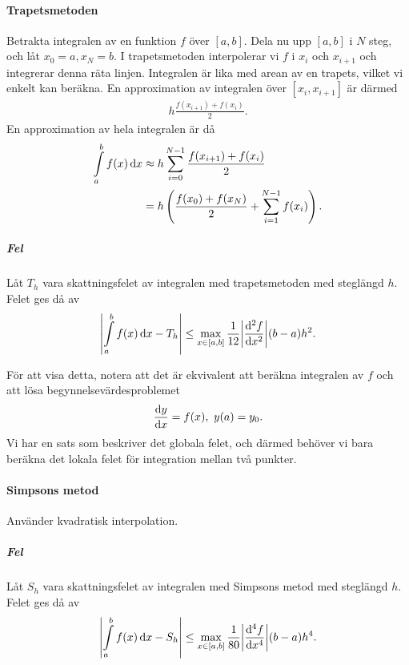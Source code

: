 \paragraph{Trapetsmetoden}
Betrakta integralen av en funktion $f$ över $[a, b]$. Dela nu upp $[a, b]$ i $N$ steg, och låt $x_{0} = a, x_{N} = b$. I trapetsmetoden interpolerar vi $f$ i $x_{i}$ och $x_{i + 1}$ och integrerar denna räta linjen. Integralen är lika med arean av en trapets, vilket vi enkelt kan beräkna. En approximation av integralen över $[x_{i}, x_{i + 1}]$ är därmed
\begin{align*}
	h\frac{f(x_{i + 1}) + f(x_{i})}{2}.
\end{align*}
En approximation av hela integralen är då
\begin{align*}
	\int\limits_{a}^{b}f(x)\dd{x} &\approx h\sum\limits_{i = 0}^{N - 1}\frac{f(x_{i + 1}) + f(x_{i})}{2} \\
	                        &= h\left(\frac{f(x_{0}) + f(x_{N})}{2} + \sum\limits_{i = 1}^{N - 1}f(x_{i})\right).
\end{align*}

\subparagraph{Fel}
Låt $T_{h}$ vara skattningsfelet av integralen med trapetsmetoden med steglängd $h$. Felet ges då av
\begin{align*}
	\abs{\int\limits_{a}^{b}f(x)\dd{x} - T_{h}} \leq \max\limits_{x\in [a, b]}\frac{1}{12}\abs{\dv[2]{f}{x} (x)}(b - a)h^{2}.
\end{align*}

För att visa detta, notera att det är ekvivalent att beräkna integralen av $f$ och att lösa begynnelsevärdesproblemet
\begin{align*}
	\dv{y}{x} = f(x),\ y(a) = y_{0}.
\end{align*}
Vi har en sats som beskriver det globala felet, och därmed behöver vi bara beräkna det lokala felet för integration mellan två punkter.

\paragraph{Simpsons metod}
Använder kvadratisk interpolation.

\subparagraph{Fel}
Låt $S_{h}$ vara skattningsfelet av integralen med Simpsons metod med steglängd $h$. Felet ges då av
\begin{align*}
	\abs{\int\limits_{a}^{b}f(x)\dd{x} - S_{h}} \leq \max\limits_{x\in [a, b]}\frac{1}{80}\abs{\dv[4]{f}{x} (x)}(b - a)h^{4}.
\end{align*}

